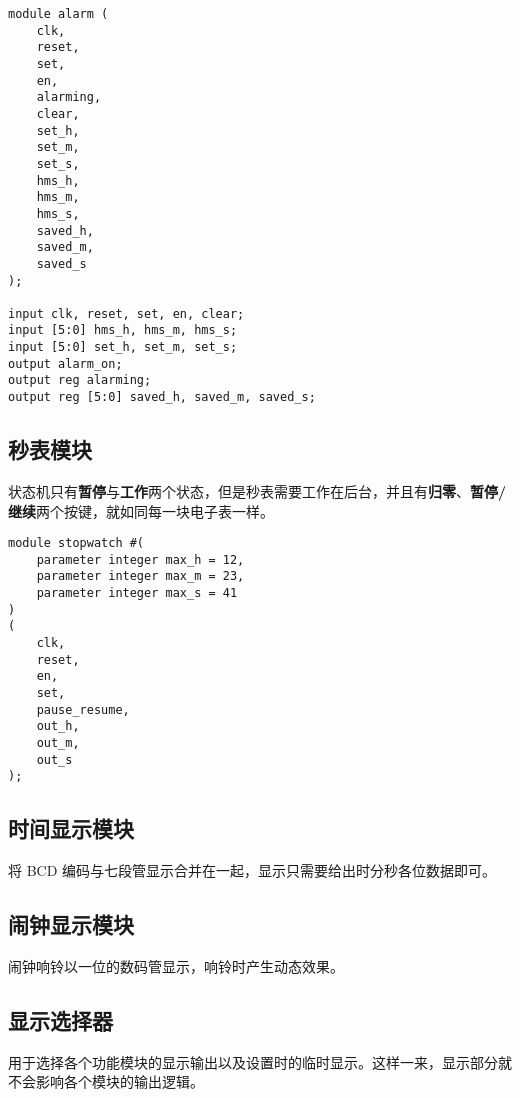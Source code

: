 \documentclass[lang=cn,11pt,a4paper,cite=authoryear]{elegantpaper}
\begin{document}
\begin{lstlisting}[caption={闹钟模块端口定义}]
module alarm (
    clk,
    reset,
    set,
    en,
    alarming,
    clear,
    set_h,
    set_m,
    set_s,
    hms_h,
    hms_m,
    hms_s,
    saved_h, 
    saved_m, 
    saved_s
);

input clk, reset, set, en, clear;
input [5:0] hms_h, hms_m, hms_s;
input [5:0] set_h, set_m, set_s;
output alarm_on;
output reg alarming;
output reg [5:0] saved_h, saved_m, saved_s;
\end{lstlisting}
    
\subsection{秒表模块}

状态机只有\textbf{暂停}与\textbf{工作}两个状态，但是秒表需要工作在后台，并且有\textbf{归零}、\textbf{暂停/继续}两个按键，就如同每一块电子表一样。


\begin{lstlisting}[caption={闹钟模块端口定义}]
module stopwatch #(
    parameter integer max_h = 12,
    parameter integer max_m = 23,
    parameter integer max_s = 41
) 
(
    clk,
    reset,
    en,
    set,
    pause_resume,
    out_h,
    out_m,
    out_s
);
\end{lstlisting}

\subsection{时间显示模块}

将 BCD 编码与七段管显示合并在一起，显示只需要给出时分秒各位数据即可。

\subsection{闹钟显示模块}

闹钟响铃以一位的数码管显示，响铃时产生动态效果。

\subsection{显示选择器}

用于选择各个功能模块的显示输出以及设置时的临时显示。这样一来，显示部分就不会影响各个模块的输出逻辑。



\end{document}
